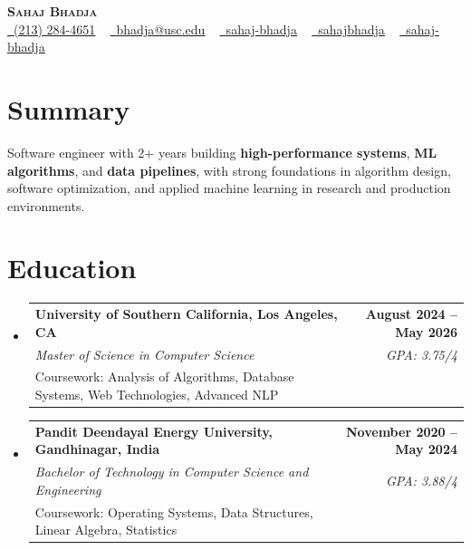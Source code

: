 \documentclass[letterpaper,10pt]{article}
\makeatletter
\newcommand{\resumeEduSubheading}[5]{\vspace{-1pt}\item\begin{tabular*}{1.0\textwidth}[t]{l@{\extracolsep{\fill}}r}\textbf{#1} & \textbf{\small #2} \\\textit{\small #3} & \textit{\small #4} \\\small #5 & \\\end{tabular*}\vspace{-4pt}}
\newcommand{\resumeSubHeadingListStart}{\begin{itemize}[leftmargin=0.0in, label={}]}
\newcommand{\resumeSubHeadingListEnd}{\end{itemize}}
\makeatother
\begin{document}
\begin{center}
{\Huge \scshape \textbf{Sahaj Bhadja}} \\ \vspace{1pt}
\small \href{tel:(213) 284-4651}{\faPhone\ \underline{(213) 284-4651}} ~ \href{mailto: bhadja@usc.edu}{\raisebox{-0.2\height}\faEnvelope\ \underline{bhadja@usc.edu}} ~
\href{https://www.linkedin.com/in/sahaj-bhadja/}{\raisebox{-0.2\height}\faLinkedin\ \underline{sahaj-bhadja}} ~ \href{https://github.com/SAHAJ-BHADJA}{\raisebox{-0.2\height}\faGithub\ \underline{sahajbhadja}} ~
\href{https://sahaj-bhadja.vercel.app/}{\raisebox{-0.2\height}\faGlobe\ \underline{sahaj-bhadja}}
\end{center}
\vspace{-18pt}
\section{Summary}
\begin{itemize}[leftmargin=0.15in, label={}]
\small{\item{Software engineer with 2+ years building \textbf{high-performance systems}, \textbf{ML algorithms}, and \textbf{data pipelines}, with strong foundations in algorithm design, software optimization, and applied machine learning in research and production environments.}}
\end{itemize}
\vspace{-16pt}
\section{Education}
\resumeSubHeadingListStart
\resumeEduSubheading{University of Southern California, Los Angeles, CA}{August 2024 -- May 2026}{Master of Science in Computer Science}{GPA: 3.75/4}{Coursework: Analysis of Algorithms, Database Systems, Web Technologies, Advanced NLP}
\vspace{-9pt}
\resumeEduSubheading{Pandit Deendayal Energy University, Gandhinagar, India}{November 2020 -- May 2024}{Bachelor of Technology in Computer Science and Engineering}{GPA: 3.88/4}{Coursework: Operating Systems, Data Structures, Linear Algebra, Statistics}
\resumeSubHeadingListEnd
\vspace{-14pt}
\end{document}
